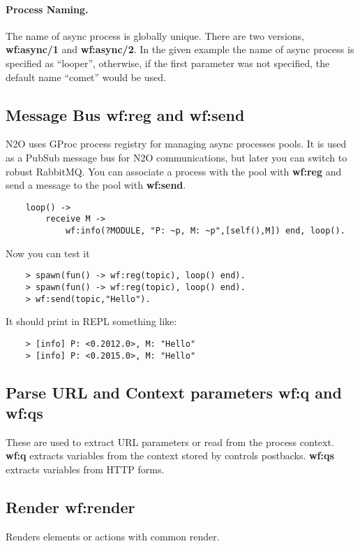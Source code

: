 \paragraph{\bf Process Naming.} The name of async process is globally unique. There are two
versions, {\bf wf:async/1} and {\bf wf:async/2}. In the given example
the name of async process is specified as ``looper'', otherwise,
if the first parameter was not specified, the default name ``comet'' would be used.

\subsection{Message Bus {\bf wf:reg} and {\bf wf:send}}
N2O uses GProc process registry for managing async processes pools.
It is used as a PubSub message bus for N2O communications, but later you can switch to robust RabbitMQ.
You can associate a process with the pool with {\bf wf:reg} and send a message to the pool with {\bf wf:send}.

\vspace{1\baselineskip}
\begin{lstlisting}
    loop() ->
        receive M ->
            wf:info(?MODULE, "P: ~p, M: ~p",[self(),M]) end, loop().
\end{lstlisting}

Now you can test it

\begin{lstlisting}
    > spawn(fun() -> wf:reg(topic), loop() end).
    > spawn(fun() -> wf:reg(topic), loop() end).
    > wf:send(topic,"Hello").
\end{lstlisting}

It should print in REPL something like:

\begin{lstlisting}
    > [info] P: <0.2012.0>, M: "Hello"
    > [info] P: <0.2015.0>, M: "Hello"
\end{lstlisting}

\subsection{Parse URL and Context parameters {\bf wf:q} and {\bf wf:qs}}
These are used to extract URL parameters or read from the process context. {\bf wf:q} extracts variables
from the context stored by controls postbacks. {\bf wf:qs} extracts variables from HTTP forms.

\subsection{Render {\bf wf:render}}
Renders elements or actions with common render.

